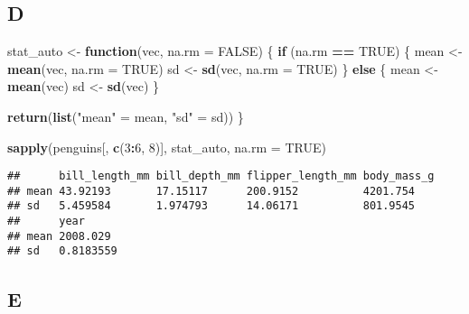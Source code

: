 \documentclass[
]{article}
\newenvironment{Shaded}{\begin{snugshade}}{\end{snugshade}}
\newcommand{\AttributeTok}[1]{\textcolor[rgb]{0.13,0.29,0.53}{#1}}
\newcommand{\ConstantTok}[1]{\textcolor[rgb]{0.56,0.35,0.01}{#1}}
\newcommand{\ControlFlowTok}[1]{\textcolor[rgb]{0.13,0.29,0.53}{\textbf{#1}}}
\newcommand{\DecValTok}[1]{\textcolor[rgb]{0.00,0.00,0.81}{#1}}
\newcommand{\FunctionTok}[1]{\textcolor[rgb]{0.13,0.29,0.53}{\textbf{#1}}}
\newcommand{\NormalTok}[1]{#1}
\newcommand{\OtherTok}[1]{\textcolor[rgb]{0.56,0.35,0.01}{#1}}
\newcommand{\SpecialCharTok}[1]{\textcolor[rgb]{0.81,0.36,0.00}{\textbf{#1}}}
\newcommand{\StringTok}[1]{\textcolor[rgb]{0.31,0.60,0.02}{#1}}
\begin{document}
\hypertarget{d}{%
\subsection{D}\label{d}}

\begin{Shaded}
\begin{Highlighting}[]
\NormalTok{stat\_auto }\OtherTok{\textless{}{-}} \ControlFlowTok{function}\NormalTok{(vec, }\AttributeTok{na.rm =} \ConstantTok{FALSE}\NormalTok{) \{}
  \ControlFlowTok{if}\NormalTok{ (na.rm }\SpecialCharTok{==} \ConstantTok{TRUE}\NormalTok{) \{}
\NormalTok{    mean }\OtherTok{\textless{}{-}} \FunctionTok{mean}\NormalTok{(vec, }\AttributeTok{na.rm =} \ConstantTok{TRUE}\NormalTok{)}
\NormalTok{    sd }\OtherTok{\textless{}{-}} \FunctionTok{sd}\NormalTok{(vec, }\AttributeTok{na.rm =} \ConstantTok{TRUE}\NormalTok{)}
\NormalTok{  \} }\ControlFlowTok{else}\NormalTok{ \{}
\NormalTok{    mean }\OtherTok{\textless{}{-}} \FunctionTok{mean}\NormalTok{(vec)}
\NormalTok{    sd }\OtherTok{\textless{}{-}} \FunctionTok{sd}\NormalTok{(vec)}
\NormalTok{  \}}

  \FunctionTok{return}\NormalTok{(}\FunctionTok{list}\NormalTok{(}\StringTok{"mean"} \OtherTok{=}\NormalTok{ mean, }\StringTok{"sd"} \OtherTok{=}\NormalTok{ sd))}
\NormalTok{\}}

\FunctionTok{sapply}\NormalTok{(penguins[, }\FunctionTok{c}\NormalTok{(}\DecValTok{3}\SpecialCharTok{:}\DecValTok{6}\NormalTok{, }\DecValTok{8}\NormalTok{)], stat\_auto, }\AttributeTok{na.rm =} \ConstantTok{TRUE}\NormalTok{)}
\end{Highlighting}
\end{Shaded}

\begin{verbatim}
##      bill_length_mm bill_depth_mm flipper_length_mm body_mass_g
## mean 43.92193       17.15117      200.9152          4201.754   
## sd   5.459584       1.974793      14.06171          801.9545   
##      year     
## mean 2008.029 
## sd   0.8183559
\end{verbatim}

\hypertarget{e}{%
\subsection{E}\label{e}}
\end{document}

